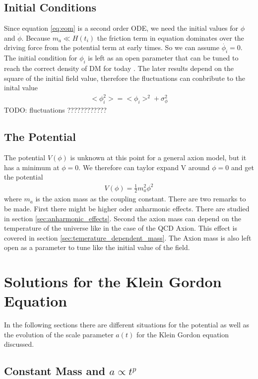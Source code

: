 \documentclass[a4paper]{article}
\begin{document}
\subsection{Initial Conditions}
Since equation \ref{eq:eom} is a second order ODE, we need the initial values
for $\phi$ and $\dot{\phi}$.
Because $m_a \ll H(t_i)$ the friction term in equation dominates over the
driving force from the potential term at early times.
So we can assume $\dot{\phi_i} = 0$.
The initial condition for $\phi_i$ is left as an open parameter that can be tuned to
reach the correct density of DM for today \cite[Chap. 4.2, Page 26]{MarshAxionCosmo}.
The later results depend on the square of the initial field value, therefore the fluctuations can conbribute to the
inital value
\begin{align}
    < \phi_i^2 > = < \phi_i > ^ 2 + \sigma_\phi ^ 2
\end{align}
TODO: fluctuations ????????????

\subsection{The Potential}
The potential $V(\phi)$ is unknown at this point for a general axion model, but it has a minimum
at $\phi = 0$. We therefore can taylor expand V around $\phi = 0$
and get the potential
\begin{align}
    \label{eq:potential}
    V(\phi) = \frac{1}{2} m_a^2 \phi^2
\end{align}
where $m_a$ is the axion mass as the coupling constant.
There are two remarks to be made.
First there might be higher oder anharmonic effects.
There are studied in section \ref{sec:anharmonic_effects}.
Second the axion mass can depend on the temperature of
the universe like in the case of the QCD Axion.
This effect is covered in section \ref{sec:temerature_dependent_mass}.
The Axion mass is also left open as a parameter to tune like
the initial value of the field.

\section{Solutions for the Klein Gordon Equation}
In the following sections there are different
situations for the potential as well as the
evolution of the scale parameter $a(t)$ for the
Klein Gordon equation discussed.

\subsection{Constant Mass and $a \propto t^p$}
\end{document}
